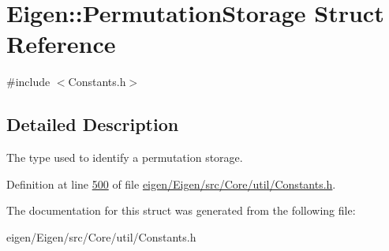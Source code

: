 \hypertarget{struct_eigen_1_1_permutation_storage}{}\section{Eigen\+:\+:Permutation\+Storage Struct Reference}
\label{struct_eigen_1_1_permutation_storage}


{\ttfamily \#include $<$Constants.\+h$>$}



\subsection{Detailed Description}
The type used to identify a permutation storage. 

Definition at line \hyperlink{eigen_2_eigen_2src_2_core_2util_2_constants_8h_source_l00500}{500} of file \hyperlink{eigen_2_eigen_2src_2_core_2util_2_constants_8h_source}{eigen/\+Eigen/src/\+Core/util/\+Constants.\+h}.



The documentation for this struct was generated from the following file\+:\begin{DoxyCompactItemize}
\item 
eigen/\+Eigen/src/\+Core/util/\+Constants.\+h\end{DoxyCompactItemize}
